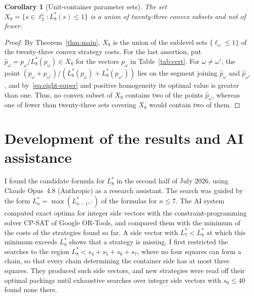 \documentclass[12pt]{amsart}
\newtheorem{corollary}[theorem]{Corollary}
\theoremstyle{definition}
\theoremstyle{remark}
\numberwithin{equation}{section}
\numberwithin{figure}{section}
\numberwithin{table}{section}
\begin{document}
\begin{corollary}[Unit-container parameter sets]\label{cor:unit}
The set $X_8=\{s\in\ell_2^\downarrow:L_8^*(s)\le1\}$ is a union of
twenty-three convex subsets and not of fewer.
\end{corollary}
\begin{proof}
By Theorem~\ref{thm:main}, $X_8$ is the union of the sublevel sets
$\{\ell_\omega\le1\}$ of the twenty-three convex strategy costs. For the
last assertion, put $\hat p_\omega=p_\omega/L_8^*(p_\omega)\in X_8$ for the
vectors $p_\omega$ in Table~\ref{tab:cert}. For $\omega\ne\omega'$, the point
$(p_\omega+p_{\omega'})/(L_8^*(p_\omega)+L_8^*(p_{\omega'}))$ lies on the
segment joining $\hat p_\omega$ and $\hat p_{\omega'}$, and
by~\eqref{eq:eight-super} and positive homogeneity its optimal value is
greater than one. Thus, no convex subset of $X_8$ contains two of the
points $\hat p_\omega$, whereas one of fewer than twenty-three sets
covering $X_8$ would contain two of them.
\end{proof}

\section*{Development of the results and AI assistance}
I found the candidate formula for $L_8^*$ in the second half of
July 2026, using Claude Opus~4.8 (Anthropic) as a research assistant.
The search was guided by the form $L_n^*=\max(L_{n-1}^*,\cdot)$ of the
formulas for $n\le7$. The AI system computed exact optima for integer side
vectors with the constraint-programming solver CP-SAT of Google OR-Tools,
and compared them with the minimum of the costs of the strategies found so
far. A side vector with $L_7^*<L_8^*$ at which this minimum exceeds $L_8^*$
shows that a strategy is missing. I first restricted the searches to the
region $L_8^*<s_4+s_5+s_6+s_7$, where no four squares can form a chain, so
that every chain determining the container side has at most three squares.
They produced such side vectors, and new strategies were
read off their optimal packings until exhaustive searches over integer side
vectors with $s_0\le40$ found none there.
\end{document}
